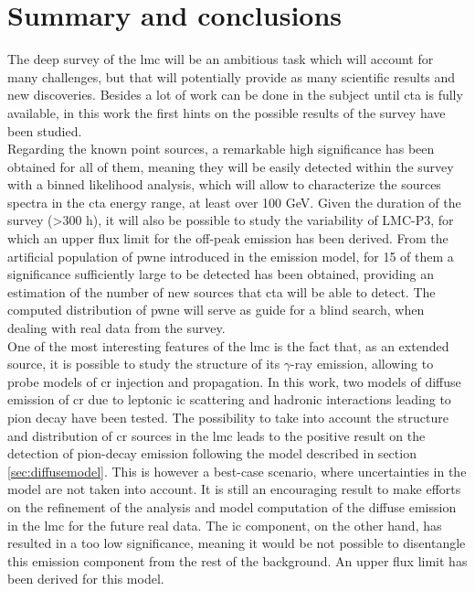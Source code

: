 \documentclass[main.tex]{subfiles}
\begin{document}
\section{Summary and conclusions}

The deep survey of the \gls{lmc} will be an ambitious task which will account for many challenges, but that will potentially provide as many scientific results and new discoveries. Besides a lot of work can be done in the subject until \gls{cta} is fully available, in this work the first hints on the possible results of the survey have been studied.\\
Regarding the known point sources, a remarkable high significance has been obtained for all of them, meaning they will be easily detected within the survey with a binned likelihood analysis, which will allow to characterize the sources spectra in the \gls{cta} energy range, at least over 100 GeV. Given the duration of the survey (>300 h), it will also be possible to study the variability of LMC-P3, for which an upper flux limit for the off-peak emission has been derived. From the artificial population of \gls{pwne} introduced in the emission model, for 15 of them a significance sufficiently large to be detected has been obtained, providing an estimation of the number of new sources that \gls{cta} will be able to detect. The computed distribution of \gls{pwne} will serve as guide for a blind search, when dealing with real data from the survey.\\
One of the most interesting features of the \gls{lmc} is the fact that, as an extended source, it is possible to study the structure of its $\gamma$-ray emission, allowing to probe models of \gls{cr} injection and propagation. In this work, two models of diffuse emission of \gls{cr} due to leptonic \gls{ic} scattering and hadronic interactions leading to pion decay have been tested. The possibility to take into account the structure and distribution of \gls{cr} sources in the \gls{lmc} leads to the positive result on the detection of pion-decay emission following the model described in section \ref{sec:diffusemodel}. This is however a best-case scenario, where uncertainties in the model are not taken into account. It is still an encouraging result to make efforts on the refinement of the analysis and model computation of the diffuse emission in the \gls{lmc} for the future real data. The \gls{ic} component, on the other hand, has resulted in a too low significance, meaning it would be not possible to disentangle this emission component from the rest of the background. An upper flux limit has been derived for this model.\\
\end{document}
